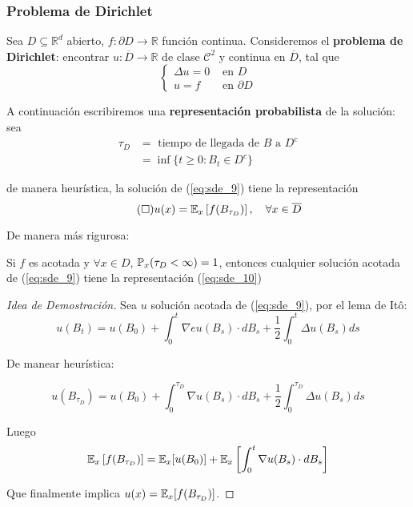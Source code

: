 \subsubsection{Problema de Dirichlet}

Sea $D \subseteq \mathbb{R}^d$ abierto, $f:\partial D \to \mathbb{R}$ función continua. Consideremos el 
\textbf{problema de Dirichlet}: encontrar $u: \overline{D} \to  \mathbb{R}$ de clase $\mathcal{C}^2$
y continua en $\overline{D}$, tal que 
\begin{equation*}
        \label{eq:sde_9}
        \tag{D}
        \begin{cases}
                \Delta u = 0 & \text{ en } D \\ 
                u = f & \text{ en } \partial D
        \end{cases}
\end{equation*}

A continuación escribiremos una \textbf{representación probabilista} de la solución: sea 
\begin{align*}
        \tau_D 
        &= \text{ tiempo de llegada de } B \text{ a }  D^{c} \\
        &= \inf \{ t \ge 0 : B_t \in D^{c} \}
\end{align*}

de manera heurística, la solución de (\ref{eq:sde_9}) tiene la representación 
\begin{equation*}
        \label{eq:sde_10} 
        \tag{$ \square$}
        u(x) = \E_{x} \left[ f(B_{\tau_D}) \right], ~ ~ ~ \forall x \in \overline{D}
\end{equation*}

De manera más rigurosa:
\begin{theorem}
        Si $f$ es acotada y $\forall x \in D$, $\P_x ( \tau_D < \infty) = 1$, entonces cualquier 
        solución acotada de (\ref{eq:sde_9}) tiene la representación (\ref{eq:sde_10})
\end{theorem}

\begin{proof}[Idea de Demostración]
\gris
Sea $u$ solución acotada de (\ref{eq:sde_9}), por el lema de It\^{o}: 
\begin{equation*}
        u(B_t) = u(B_0) + \int_{0}^{t} \nabla e u (B_s) \cdot dB_s 
                + \frac{1}{2} \int_{0}^{t} \Delta u(B_s) ds
\end{equation*}

De manear heurística: 

\begin{equation*}
        u(B_{\tau_D}) = u(B_0) + \int_{0}^{\tau_D} \nabla u(B_s) \cdot  dB_s 
        + \frac{1}{2} \int_{0}^{\tau_D} \Delta u(B_s) ds
\end{equation*}

Luego 
\begin{align*}
        \E_x \left[ f(B_{\tau_D}) \right] = \E_x[u(B_0)] 
        + \E_x \left[ \int_{0}^{t} \nabla u (B_s) \cdot dB_s \right] 
\end{align*}

Que finalmente implica $u(x) = \E_x[f(B_{\tau_{D}})]$.\findem
\negro
\end{proof}

